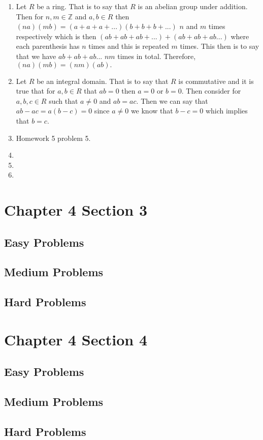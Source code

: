 \documentclass[11pt]{article}
\newcommand{\Z}{\mathbb{Z}}
\begin{document}
\begin{enumerate}
    \item 
    
    Let $R$ be a ring. That is to say that $R$ is an abelian group under addition. Then for $n,m\in \Z$ and $a,b\in R$ then $(na)(mb)=(a+a+a+...)(b+b+b+...)$ $n$ and $m$ times respectively which is then $(ab+ab+ab+...)+(ab+ab+ab...)$ where each parenthesis has $n$ times and this is repeated $m$ times. This then is to say that we have $ab+ab+ab...$ $nm$ times in total. Therefore, $(na)(mb)=(nm)(ab).$
    
    \item
    
    Let $R$ be an integral domain. That is to say that $R$ is commutative and it is true that for $a,b\in R$ that $ab=0$ then $a=0$ or $b=0.$ Then consider for $a,b,c\in R$ such that $a\neq 0$ and $ab=ac$. Then we can say that $ab-ac= a(b-c) = 0$ since $a\neq 0$ we know that $b-c=0$ which implies that $b=c$.
    
    \item
    
    Homework 5 problem 5.
    
    \item
    
    
    
    \item
    
    
    
    \item
\end{enumerate}

\section{Chapter 4 Section 3}

\subsection{Easy Problems}



\subsection{Medium Problems}



\subsection{Hard Problems}



\section{Chapter 4 Section 4}

\subsection{Easy Problems}



\subsection{Medium Problems}



\subsection{Hard Problems}
\end{document}
